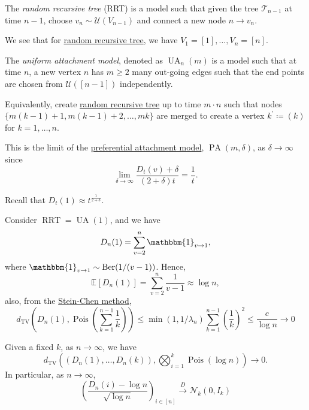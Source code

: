 \begin{definition}\label{def:random-recursive-tree}
	The \emph{random recursive tree} (RRT) is a model such that given the tree \(\mathcal{T} _{n-1}\) at time \(n-1\), choose \(v_n \sim \mathcal{U} (V_{n-1})\) and connect a new node \(n \to v_n\).
\end{definition}

\begin{note}
	We see that for \hyperref[def:random-recursive-tree]{random recursive tree}, we have \(V_1 = [1], \dots , V_n = [n]\).
\end{note}

\begin{definition}\label{def:uniform-attachment-model}
	The \emph{uniform attachment model}, denoted as \(\operatorname{UA}_n(m) \) is a model such that at time \(n\), a new vertex \(n\) has \(m \geq 2\) many out-going edges such that the end points are chosen from \(\mathcal{U} ([n-1])\) independently.

	Equivalently, create \hyperref[def:random-recursive-tree]{random recursive tree} up to time \(m \cdot n\) such that nodes \(\{ m(k-1)+1, m(k-1)+2, \dots , mk \} \) are merged to create a vertex \(k^{\prime} \coloneqq (k)\) for \(k = 1, \dots , n\).
\end{definition}

This is the limit of the \hyperref[def:preferential-attachment-model]{preferential attachment model}, \(\operatorname{PA}(m, \delta ) \), as \(\delta \to \infty \) since
\[
	\lim_{\delta \to \infty} \frac{D_t(v) + \delta }{(2 + \delta ) t}
	= \frac{1}{t}.
\]
\begin{prev}
	Recall that \(D_t(1) \approx t^{\frac{1}{2 + \delta }}\).
\end{prev}

Consider \(\operatorname{RRT} = \operatorname{UA}(1) \), and we have
\[
	D_n(1)
	= \sum_{v=2}^{n} \mathbbm{1}_{v \to 1},
\]
where \(\mathbbm{1}_{v \to 1} \sim \operatorname{Ber}(1 / (v-1)) \). Hence,
\[
	\mathbb{E}_{}[D_n(1)]
	= \sum_{v=2}^{n} \frac{1}{v-1}
	\approx \log n,
\]
also, from the \hyperref[thm:Stein-Chen-method]{Stein-Chen method},
\[
	d_{\mathrm{TV} }\left( D_n(1), \operatorname{Pois}\left( \sum_{k=1}^{n-1} \frac{1}{k} \right) \right)
	\leq \min (1, 1 / \lambda _n) \sum_{k=1}^{n-1} \left( \frac{1}{k} \right) ^2
	\leq \frac{c}{\log n} \to 0
\]

\begin{lemma}
	Given a fixed \(k\), as \(n \to \infty \), we have
	\[
		d_{\mathrm{TV} }\left( (D_n(1), \dots , D_n(k)) , \bigotimes_{i=1}^{k} \operatorname{Pois}(\log n)  \right)
		\to 0.
	\]
	In particular, as \(n \to \infty \),
	\[
		\left( \frac{D_n(i) - \log n}{\sqrt{\log n} } \right) _{i \in [n]}
		\overset{D}{\to} \mathcal{N} _k(0, I_k)
	\]
\end{lemma}

